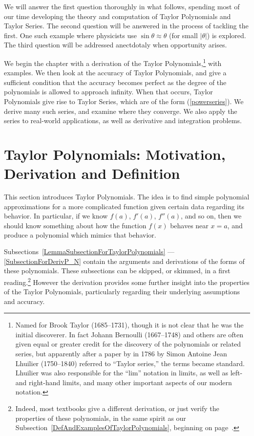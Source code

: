 We will answer the first question thoroughly in what follows, 
spending most of our time developing the theory and computation
of Taylor Polynomials and Taylor Series. 
The second question will be answered in the process of tackling
the first.  One such example where physicists use
$\sin \theta\approx \theta$ (for small $|\theta|$) is
explored.  The third question will be addressed
anectdotaly when opportunity arises.

We begin the chapter with a derivation of the Taylor Polynomials,\footnote{%
Named for Brook Taylor (1685--1731), though it is not clear that he
was the initial discoverer.  In fact Johann Bernoulli (1667--1748) 
and others are often given equal or greater credit for the discovery of
the polynomials or related series, but apparently after a paper by
in 1786 by Simon Antoine Jean Lhuilier (1750--1840)
referred to ``Taylor series,'' the terms became standard.
Lhuilier was also responsible for the ``lim'' notation in limits,
as well as left- and right-hand limits, and many other important 
aspects of our modern notation.  
}
with examples.  We then look at the accuracy of Taylor Polynomials,
and give a sufficient condition that the accuracy
becomes perfect as the degree of the polynomials is allowed
to approach infinity.  When that occurs, Taylor Polynomials
give rise to Taylor Series, which are of the
form (\ref{powerseries}).  We derive many such series, and
examine where they converge.  We also apply the series
to real-world applications, as well as derivative and
integration problems.




\newpage
\section{Taylor Polynomials:
 Motivation, Derivation and Definition}
This section introduces Taylor Polynomials.
The idea is to find  simple polynomial  approximations
for a more complicated function given certain data regarding its behavior.
In particular, if we know $f(a)$, $f'(a)$, $f''(a)$, and
so on, then we should know something about how the
function $f(x)$ behaves near $x=a$, and produce a polynomial 
which mimics that behavior.

Subsections~\ref{LemmaSubsectionForTaylorPolynomials}%
---\ref{SubsectionForDerivP_N}
contain the arguments and derivations of the forms of these
polynomials.  These subsections can be skipped, or skimmed,
in a first reading.\footnote{%
Indeed, most textbooks give a different derivation, or just
verify  the properties of these polynomials, 
in the same spirit as our 
Subsection~\ref{DefAndExamplesOfTaylorPolynomials},
beginning on page~\pageref{DefAndExamplesOfTaylorPolynomials}.}
However the derivation provides some further insight into 
the properties of the Taylor Polynomials, particularly regarding
their underlying assumptions and accuracy.

